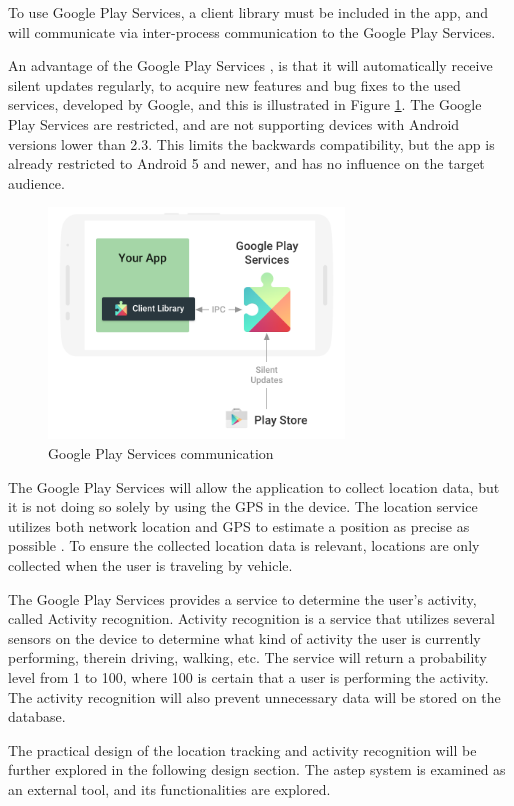 To use Google Play Services, a client library must be included in the app, and will communicate via inter-process communication to the Google Play Services. 

An advantage of the Google Play Services \cite{GapiOverview}, is that it will automatically receive silent updates regularly, to acquire new features and bug fixes to the used services, developed by Google, and this is illustrated in Figure \ref{fig:gapifigure}.
The Google Play Services are restricted, and are not supporting devices with Android versions lower than 2.3. 
This limits the backwards compatibility, but the app is already restricted to Android 5 and newer, and has no influence on the target audience.

\begin{figure}[h]
	\centering
	\includegraphics[width=0.7\textwidth]{figures/play-services-diagram.png}
	\caption{Google Play Services communication\cite{GapiFigure}}
	\label{fig:gapifigure}
\end{figure}

The Google Play Services will allow the application to collect location data, but it is not doing so solely by using the GPS in the device. 
The location service utilizes both network location and GPS to estimate a position as precise as possible \cite{GapiLocation}. 
To ensure the collected location data is relevant, locations are only collected when the user is traveling by vehicle.

The Google Play Services provides a service to determine the user's activity, called Activity recognition. 
Activity recognition is a service that utilizes several sensors on the device to determine what kind of activity the user is currently performing, therein driving, walking, etc.
The service will return a probability level from 1 to 100, where 100 is certain that a user is performing the activity.
The activity recognition will also prevent unnecessary data will be stored on the database. 

The practical design of the location tracking and activity recognition will be further explored in the following design section.
The \gls{astep} system is examined as an external tool, and its functionalities are explored.